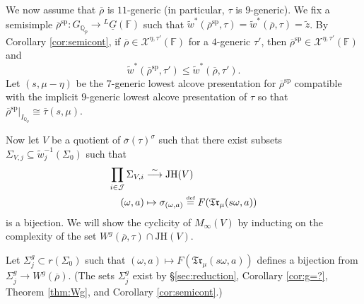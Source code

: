 \documentclass[oneside,a4paper,english, 11pt]{amsart}
\theoremstyle{plain}
\theoremstyle{plain}
\theoremstyle{plain}
\theoremstyle{plain}
\theoremstyle{plain}
\theoremstyle{plain}
\theoremstyle{definition}
\theoremstyle{definition}
\theoremstyle{definition}
\theoremstyle{remark}
\numberwithin{equation}{section}
\newcommand{\Q}{\mathbb{Q}}
\newcommand{\Qp}{\mathbb{Q}_p}
\newcommand{\F}{\mathbb{F}}
\newcommand{\cJ}{\mathcal{J}}
\newcommand{\cX}{\mathcal{X}}
\newcommand{\speci}{\mathrm{sp}}
\newcommand{\un}[1]{\underline{#1}}
\newcommand{\tld}[1]{\widetilde{#1}}
\newcommand{\JH}{\mathrm{JH}}
\newcommand{\rhobar}{\overline{\rho}}
\newcommand{\taubar}{\overline{\tau}}
\newcommand{\Trns}{\mathfrak{Tr}}
\newcommand{\defeq}{\stackrel{\textrm{\tiny{def}}}{=}}
\newcommand{\ovl}[1]{\overline{#1}}
\newcommand{\ra}{\rightarrow}
\begin{document}
We now assume that $\rhobar$ is $11$-generic (in particular, $\tau$ is $9$-generic). 
We fix a semisimple $\rhobar^{\speci}: G_{\Qp}\ra{}^{L}\un{G}(\F)$ such that $\tld{w}^*(\rhobar^\speci,\tau) = \tld{w}^*(\rhobar,\tau) = \tld{z}$. 
%
By Corollary \ref{cor:semicont}, if $\rhobar \in \cX^{\eta,\tau'}(\F)$ for a $4$-generic $\tau'$, then $\rhobar^{\speci} \in \cX^{\eta,\tau'}(\F)$ and
\begin{equation}
\label{eq:sc}
\tld{w}^{*}(\rhobar^{\speci},\tau') \leq \tld{w}^{*}(\rhobar,\tau').
\end{equation}
Let $(s,\mu-\eta)$ be the $7$-generic lowest alcove presentation for $\rhobar^\speci$ compatible with the implicit $9$-generic lowest alcove presentation of $\tau$ so that $\rhobar^\speci|_{I_{\Q_p}} \cong \taubar(s,\mu)$. 
%
%
%

Now let $V$ be a quotient of $\ovl{\sigma}(\tau)^\sigma$ such that there exist subsets $\Sigma_{V,j}\subseteq \tld{w}_j^{-1}(\Sigma_0)$ such that
\begin{align*}
\label{it:bij:cyclic}
\prod_{i\in\cJ} \Sigma_{V,i}&\stackrel{\sim}{\longrightarrow} \JH(V)\\
(\omega,a)&\mapsto \sigma_{(\omega,a)}\defeq F(\Trns_{\mu}(s\omega,a))
\end{align*}
is a bijection. 
We will show the cyclicity of $M_\infty(V)$ by inducting on the complexity of the set $W^g(\rhobar,\tau) \cap \JH(V)$. 

Let $\Sigma^g_j \subset r(\Sigma_0)$ such that $(\omega,a) \mapsto F(\Trns_{\mu}(s\omega,a))$ defines a bijection from $\Sigma^g_j \ra W^g(\rhobar)$. (The sets $\Sigma^g_j$ exist by \S \ref{sec:reduction}, Corollary \ref{cor:g=?}, Theorem \ref{thm:Wg}, and Corollary \ref{cor:semicont}.)
\end{document}
